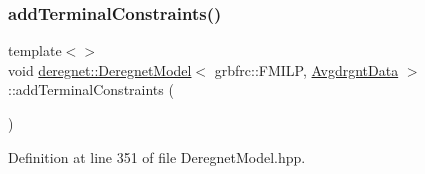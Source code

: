 \subsubsection{\texorpdfstring{add\+Terminal\+Constraints()}{addTerminalConstraints()}\hspace{0.1cm}{\footnotesize\ttfamily [2/2]}}
{\footnotesize\ttfamily template$<$$>$ \\
void \hyperlink{classderegnet_1_1DeregnetModel}{deregnet\+::\+Deregnet\+Model}$<$ grbfrc\+::\+F\+M\+I\+LP, \hyperlink{classderegnet_1_1AvgdrgntData}{Avgdrgnt\+Data} $>$\+::add\+Terminal\+Constraints (\begin{DoxyParamCaption}{ }\end{DoxyParamCaption})\hspace{0.3cm}{\ttfamily [inline]}}



Definition at line 351 of file Deregnet\+Model.\+hpp.


